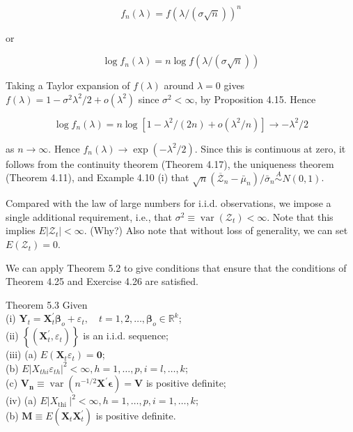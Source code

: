 \documentclass[10pt]{article}
\begin{document}
$$
f_{n}(\lambda)=f(\lambda /(\sigma \sqrt{n}))^{n}
$$

or

$$
\log f_{n}(\lambda)=n \log f(\lambda /(\sigma \sqrt{n}))
$$

Taking a Taylor expansion of $f(\lambda)$ around $\lambda=0$ gives $f(\lambda)=1-\sigma^{2} \lambda^{2} / 2+ o\left(\lambda^{2}\right)$ since $\sigma^{2}<\infty$, by Proposition 4.15. Hence

$$
\log f_{n}(\lambda)=n \log \left[1-\lambda^{2} /(2 n)+o\left(\lambda^{2} / n\right)\right] \rightarrow-\lambda^{2} / 2
$$

as $n \rightarrow \infty$. Hence $f_{n}(\lambda) \rightarrow \exp \left(-\lambda^{2} / 2\right)$. Since this is continuous at zero, it follows from the continuity theorem (Theorem 4.17), the uniqueness theorem (Theorem 4.11), and Example 4.10 (i) that $\sqrt{n}\left(\overline{\mathcal{Z}}_{n}-\bar{\mu}_{n}\right) / \bar{\sigma}_{n} \stackrel{A}{\sim} N(0,1)$.

Compared with the law of large numbers for i.i.d. observations, we impose a single additional requirement, i.e., that $\sigma^{2} \equiv \operatorname{var}\left(\mathcal{Z}_{t}\right)<\infty$. Note that this implies $E\left|\mathcal{Z}_{t}\right|<\infty$. (Why?) Also note that without loss of generality, we can set $E\left(\mathcal{Z}_{t}\right)=0$.

We can apply Theorem 5.2 to give conditions that ensure that the conditions of Theorem 4.25 and Exercise 4.26 are satisfied.

Theorem 5.3 Given\\
(i) $\mathbf{Y}_{t}=\mathbf{X}_{t}^{\prime} \boldsymbol{\beta}_{o}+\varepsilon_{t}, \quad t=1,2, \ldots, \boldsymbol{\beta}_{o} \in \mathbb{R}^{k}$;\\
(ii) $\left\{\left(\mathbf{X}_{t}^{\prime}, \varepsilon_{t}\right)\right\}$ is an i.i.d. sequence;\\
(iii) (a) $E\left(\mathbf{X}_{t} \varepsilon_{t}\right)=\mathbf{0}$;\\
(b) $E\left|X_{t h i} \varepsilon_{t h}\right|^{2}<\infty, h=1, \ldots, p, i=l, \ldots, k$;\\
(c) $\mathbf{V}_{\boldsymbol{n}} \equiv \operatorname{var}\left(n^{-1 / 2} \mathbf{X}^{\prime} \boldsymbol{\epsilon}\right)=\mathbf{V}$ is positive definite;\\
(iv) (a) $E\left|X_{\text {thi }}\right|^{2}<\infty, h=1, \ldots, p, i=1, \ldots, k$;\\
(b) $\mathbf{M} \equiv E\left(\mathbf{X}_{t} \mathbf{X}_{t}^{\prime}\right)$ is positive definite.
\end{document}
